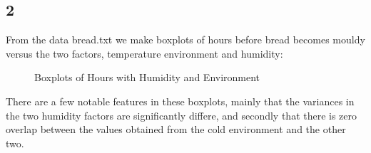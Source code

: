 \documentclass{article}
\begin{document}
    \subsection*{2}
    From the data bread.txt we make boxplots of hours before bread becomes mouldy versus the two factors, temperature environment and humidity:
      \begin{figure}[H]
          \centering
          \caption{Boxplots of Hours with Humidity and Environment}
          \label{fig:BoxHours}
      \end{figure} 
    There are a few notable features in these boxplots, mainly that the variances in the two humidity factors are significantly differe, and secondly that there is zero overlap between the values obtained from the cold environment and the other two.
    
\end{document}
